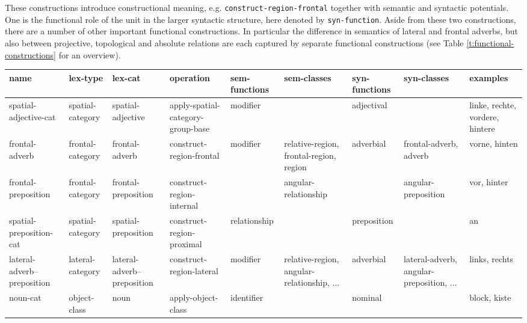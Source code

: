 These constructions introduce constructional meaning, e.g. 
{\footnotesize\tt construct-region-frontal} together with semantic 
and syntactic potentials. One is the functional role of the
unit in the larger syntactic structure, here denoted by 
{\footnotesize\tt syn-function}. Aside from these two constructions, there are 
a number of other important functional constructions. 
In particular the difference in semantics of
lateral and frontal adverbs, but also between projective, topological
and absolute relations are each captured by separate 
functional constructions (see Table \ref{t:functional-constructions} for an overview).

\begin{table}
\begin{footnotesize}
\begin{tabular}{| p{1.5cm} || p{1.1cm} | p{1.45cm} || p{1.7cm} || p{1.9cm} | p{1.55cm} | p{1.45cm} | p{1.5cm} || p{1.9cm} |}
\hline
name & lex-type & lex-cat & operation & sem-functions & sem-classes & syn-functions & syn-classes & examples 
\\ \hline \hline 
spatial-adjective-cat  &spatial-category &spatial-adjective & apply-spatial-category-group-base &modifier & &adjectival & &linke, rechte, vordere, hintere
\\ \hline
frontal-adverb  &frontal-category &frontal-adverb  & construct-region-frontal &modifier &relative-region, frontal-region, region &adverbial &frontal-adverb, adverb &vorne, hinten 
\\ \hline 
frontal-preposition  &frontal-category & frontal-preposition & construct-region-internal & & angular-relationship & & angular-preposition &vor, hinter 
\\ \hline 
spatial-preposition-cat  &spatial-category &spatial-preposition & construct-region-proximal &relationship & &preposition & &an 
\\ \hline 
lateral-adverb--preposition  &lateral-category &lateral-adverb--preposition & construct-region-lateral &modifier &relative-region, angular-relationship, ... &adverbial &lateral-adverb, angular-preposition, ... &links, rechts 
\\ \hline 
noun-cat  &object-class &noun & apply-object-class &identifier & &nominal & &block, kiste 

\end{tabular}
\end{footnotesize}
\end{table}
